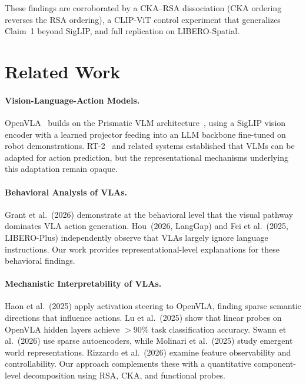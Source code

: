 \documentclass[letterpaper]{article}
\begin{document}
These findings are corroborated by a CKA--RSA dissociation (CKA ordering reverses the RSA ordering), a CLIP-ViT control experiment that generalizes Claim~1 beyond SigLIP, and full replication on LIBERO-Spatial.

\section{Related Work}
\label{sec:related}

\paragraph{Vision-Language-Action Models.}
OpenVLA~\citep{kim2024openvla} builds on the Prismatic VLM architecture~\citep{karamcheti2024prismatic}, using a SigLIP vision encoder with a learned projector feeding into an LLM backbone fine-tuned on robot demonstrations.
RT-2~\citep{brohan2023rt2} and related systems established that VLMs can be adapted for action prediction, but the representational mechanisms underlying this adaptation remain opaque.

\paragraph{Behavioral Analysis of VLAs.}
Grant et al.~(2026) demonstrate at the behavioral level that the visual pathway dominates VLA action generation.
Hou~(2026, LangGap) and Fei et al.~(2025, LIBERO-Plus) independently observe that VLAs largely ignore language instructions.
Our work provides representational-level explanations for these behavioral findings.

\paragraph{Mechanistic Interpretability of VLAs.}
Haon et al.~(2025) apply activation steering to OpenVLA, finding sparse semantic directions that influence actions.
Lu et al.~(2025) show that linear probes on OpenVLA hidden layers achieve $>$90\% task classification accuracy.
Swann et al.~(2026) use sparse autoencoders, while Molinari et al.~(2025) study emergent world representations.
Rizzardo et al.~(2026) examine feature observability and controllability.
Our approach complements these with a quantitative component-level decomposition using RSA, CKA, and functional probes.
\end{document}
